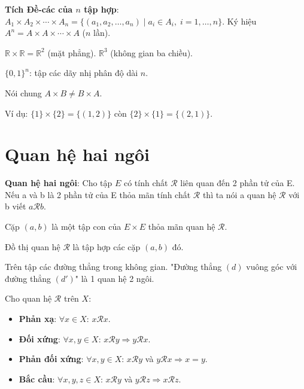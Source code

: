 \documentclass[12pt,a4paper]{article}
\begin{document}
\begin{dinhnghia}
  \textbf{Tích Đề-các của $n$ tập hợp}: $A_1 \times A_2 \times \cdots \times A_n = \{(a_1, a_2, \ldots, a_n) \mid a_i \in A_i,\; i = 1, \ldots, n\}$. Ký hiệu $A^n = A \times A \times \cdots \times A$ ($n$ lần).
\end{dinhnghia}

\begin{vidu}
  $\mathbb{R} \times \mathbb{R} = \mathbb{R}^2$ (mặt phẳng). $\mathbb{R}^3$ (không gian ba chiều). 
  
  $\{0,1\}^n$: tập các dãy nhị phân độ dài $n$.
\end{vidu}

\begin{luuy}
  Nói chung $A \times B \ne B \times A$. 
  
  Ví dụ: $\{1\} \times \{2\} = \{(1,2)\}$ còn $\{2\} \times \{1\} = \{(2,1)\}$.
\end{luuy}

\section{Quan hệ hai ngôi}

\begin{dinhnghia}
  \textbf{Quan hệ hai ngôi}: Cho tập $E$ có tính chất $\mathcal{R}$ liên quan đến 2 phần tử của E. Nếu a và b là 2 phần tử của E thỏa mãn tính chất $\mathcal{R}$ thì ta nói a quan hệ $\mathcal{R}$ với b viết $a\mathcal{R}b$.

  Cặp $(a, b)$ là một tập con của $E \times E$ thỏa mãn quan hệ $\mathcal{R}$.

  Đồ thị quan hệ $\mathcal{R}$ là tập hợp các cặp $(a, b)$ đó.
\end{dinhnghia}

\begin{vidu}
  Trên tập các đường thẳng trong không gian. "Đường thẳng $(d)$ vuông góc với đường thẳng $(d')$" là 1 quan hệ 2 ngôi.
\end{vidu}

\begin{dinhnghia}[title={Các tính chất}]
  Cho quan hệ $\mathcal{R}$ trên $X$:
  \begin{itemize}
    \item \textbf{Phản xạ}: $\forall x \in X$: $x \mathcal{R} x$.
    \item \textbf{Đối xứng}: $\forall x, y \in X$: $x \mathcal{R} y \Rightarrow y \mathcal{R} x$.
    \item \textbf{Phản đối xứng}: $\forall x, y \in X$: $x \mathcal{R} y$ và $y \mathcal{R} x \Rightarrow x = y$.
    \item \textbf{Bắc cầu}: $\forall x, y, z \in X$: $x \mathcal{R} y$ và $y \mathcal{R} z \Rightarrow x \mathcal{R} z$.
  \end{itemize}
\end{dinhnghia}
\end{document}
